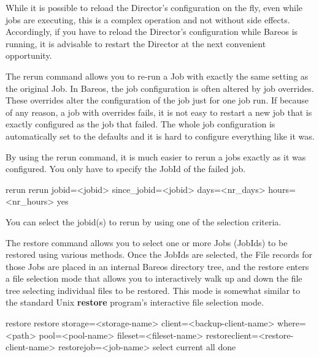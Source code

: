 \begin{description}
   While it is possible to reload the Director's configuration on the fly,
   even while jobs are executing, this is a complex operation and not
   without side effects.  Accordingly, if you have to reload the Director's
   configuration while Bareos is running, it is advisable to restart the
   Director at the next convenient opportunity.

\item [rerun]
   The rerun command allows you to re-run a Job with exactly the same setting
   as the original Job. In Bareos, the job configuration is often altered by job
   overrides. These overrides alter the configuration of the job just for one job run.
   If because of any reason, a job with overrides fails, it is not easy to restart
   a new job that is exactly configured as the job that failed. The whole job
   configuration is automatically set to the defaults and it is hard to
   configure everything like it was.

   By using the rerun command, it is much easier to rerun a jobs exactly
   as it was configured. You only have to specify the JobId of the failed job.

\begin{bconsole}{rerun}
rerun jobid=<jobid> since_jobid=<jobid> days=<nr_days> hours=<nr_hours> yes
\end{bconsole}

   You can select the jobid(s) to rerun by using one of the selection criteria.

\item [restore]
   \label{restore_command}
   The restore command allows you to select one or more Jobs (JobIds) to be
   restored using various methods.  Once the JobIds are selected, the File
   records for those Jobs are placed in an internal Bareos directory tree,
   and the restore enters a file selection mode that allows you to
   interactively walk up and down the file tree selecting individual files
   to be restored.  This mode is somewhat similar to the standard Unix {\bf
   restore} program's interactive file selection mode.

\begin{bconsole}{restore}
restore storage=<storage-name> client=<backup-client-name>
  where=<path> pool=<pool-name> fileset=<fileset-name>
  restoreclient=<restore-client-name>
  restorejob=<job-name>
  select current all done
\end{bconsole}


\end{description}
